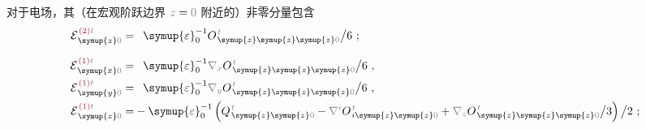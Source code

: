 对于电场，其（在宏观阶跃边界 $\mathcolor{gray}{z \mathcolor{black}{=} 0}$ 附近的）非零分量包含
\begin{subequations} \label{eq:E^(2-0)_0==}
\begin{align}
	{\mathcal{E}}^{\;\!\textcolor{Maroon}{(2)}\mathcolor{gray}{t}}_{\;\! \symup{z} \mathcolor{gray}{0}} = &\hphantom{+} {\symup{\varepsilon}}_0^{-1} O^{\;\!\mathcolor{gray}{t}}_{\;\! \symup{z}\symup{z}\symup{z}\mathcolor{gray}{0}} \big/ 6~; \label{eq:E^(2)_z0==} \\[0.7em]
	{\mathcal{E}}^{\;\!\textcolor{Maroon}{(1)}\mathcolor{gray}{t}}_{\;\! \symup{x} \mathcolor{gray}{0}} = &\hphantom{+} {\symup{\varepsilon}}_0^{-1} \mathcolor{gray}{\nabla_x} O^{\;\!\mathcolor{gray}{t}}_{\;\! \symup{z}\symup{z}\symup{z}\mathcolor{gray}{0}} \big/ 6~, \label{eq:E^(1)_x0==} \\
	{\mathcal{E}}^{\;\!\textcolor{Maroon}{(1)}\mathcolor{gray}{t}}_{\;\! \symup{y} \mathcolor{gray}{0}} = &\hphantom{+} {\symup{\varepsilon}}_0^{-1} \mathcolor{gray}{\nabla_y} O^{\;\!\mathcolor{gray}{t}}_{\;\! \symup{z}\symup{z}\symup{z}\mathcolor{gray}{0}} \big/ 6~, \label{eq:E^(1)_y0==} \\
	{\mathcal{E}}^{\;\!\textcolor{Maroon}{(1)}\mathcolor{gray}{t}}_{\;\! \symup{z} \mathcolor{gray}{0}} = &- {\symup{\varepsilon}}_0^{-1} \left( Q^{\;\!\mathcolor{gray}{t}}_{\;\! \symup{z} \symup{z} \mathcolor{gray}{0}} - \mathcolor{gray}{\nabla^i} O^{\;\!\mathcolor{gray}{t}}_{\;\! i \symup{z} \symup{z} \mathcolor{gray}{0}} + \mathcolor{gray}{\nabla_z} O^{\;\!\mathcolor{gray}{t}}_{\;\! \symup{z} \symup{z} \symup{z} \mathcolor{gray}{0}} \big/ 3 \right) \big/ 2~; \label{eq:E^(1)_z0==} \\[0.7em]

\end{align}
\end{subequations}
